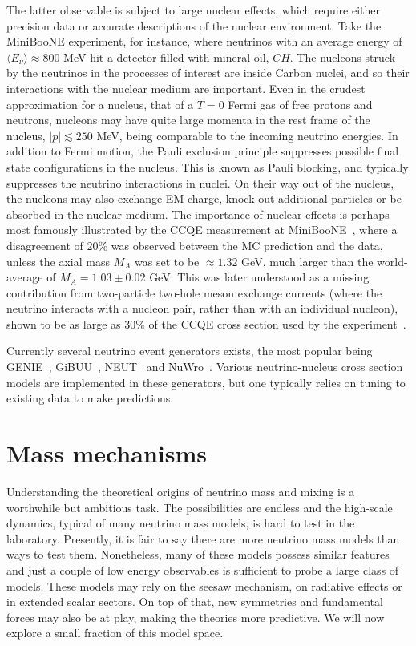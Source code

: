 The latter observable is subject to large nuclear effects, which require either precision data or accurate descriptions of the nuclear environment. Take the MiniBooNE experiment, for instance, where neutrinos with an average energy of $\langle E_\nu \rangle \approx 800 $ MeV hit a detector filled with mineral oil, $CH$. The nucleons struck by the neutrinos in the processes of interest are inside Carbon nuclei, and so their interactions with the nuclear medium are important. Even in the crudest approximation for a nucleus, that of a $T=0$ Fermi gas of free protons and neutrons, nucleons may have quite large momenta in the rest frame of the nucleus, $|p| \lesssim 250$ MeV, being comparable to the incoming neutrino energies. In addition to Fermi motion, the Pauli exclusion principle suppresses possible final state configurations in the nucleus. This is known as Pauli blocking, and typically suppresses the neutrino interactions in nuclei. On their way out of the nucleus, the nucleons may also exchange EM charge, knock-out additional particles or be absorbed in the nuclear medium. The importance of nuclear effects is perhaps most famously illustrated by the CCQE measurement at MiniBooNE~\cite{AguilarArevalo:2010zc}, where a disagreement of $20\%$ was observed between the MC prediction and the data, unless the axial mass $M_A$ was set to be $\approx1.32$ GeV, much larger than the world-average of $M_A = 1.03 \pm 0.02$ GeV. This was later understood as a missing contribution from two-particle two-hole meson exchange currents (where the neutrino interacts with a nucleon pair, rather than with an individual nucleon), shown to be as large as $30\%$ of the CCQE cross section used by the experiment~\cite{Nieves:2011yp}.

Currently several neutrino event generators exists, the most popular being GENIE~\cite{Andreopoulos:2009rq}, GiBUU~\cite{Buss:2011mx}, NEUT~\cite{Hayato:2002sd} and NuWro~\cite{Juszczak:2005zs}. Various neutrino-nucleus cross section models are implemented in these generators, but one typically relies on tuning to existing data to make predictions.

%
%
%
%

\section{Mass mechanisms}

Understanding the theoretical origins of neutrino mass and mixing is a worthwhile but ambitious task. The possibilities are endless and the high-scale dynamics, typical of many neutrino mass models, is hard to test in the laboratory. Presently, it is fair to say there are more neutrino mass models than ways to test them. Nonetheless, many of these models possess similar features and just a couple of low energy observables is sufficient to probe a large class of models. These models may rely on the seesaw mechanism, on radiative effects or in extended scalar sectors. On top of that, new symmetries and fundamental forces may also be at play, making the theories more predictive. We will now explore a small fraction of this model space.


